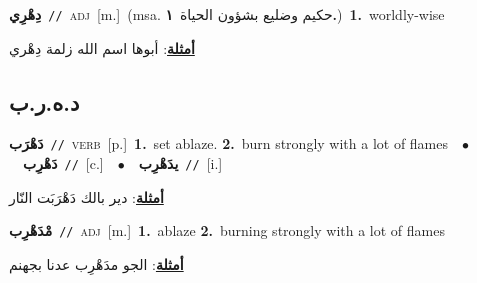 \documentclass[10pt,a4paper,twoside]{article} %
\begin{document}
\begin{multicols}{2}
{\setlength\topsep{0pt}\textbf{\foreignlanguage{arabic}{دِهْرِي}}\ {\color{gray}\texttt{//}\color{black}}\ \textsc{adj}\ [m.]\ \color{gray}(msa. \foreignlanguage{arabic}{حكيم وضليع بشؤون الحياة}~\foreignlanguage{arabic}{\textbf{١.}})\color{black}\ \textbf{1.}~worldly-wise\  \begin{flushright}\color{gray}\foreignlanguage{arabic}{\textbf{\underline{\foreignlanguage{arabic}{أمثلة}}}: أبوها اسم الله زلمة دِهْري}\end{flushright}\color{black}} \vspace{2mm}

\vspace{-3mm}
\subsection*{\color{blue}\foreignlanguage{arabic}{د.ه.ر.ب}\color{blue}{}} 

{\setlength\topsep{0pt}\textbf{\foreignlanguage{arabic}{دَهْرَب}}\ {\color{gray}\texttt{//}\color{black}}\ \textsc{verb}\ [p.]\ \textbf{1.}~set ablaze.  \textbf{2.}~burn strongly with a lot of flames\ \ $\bullet$\ \ \setlength\topsep{0pt}\textbf{\foreignlanguage{arabic}{دَهْرِب}}\ {\color{gray}\texttt{//}\color{black}}\ [c.]\ \ $\bullet$\ \ \setlength\topsep{0pt}\textbf{\foreignlanguage{arabic}{يدَهْرِب}}\ {\color{gray}\texttt{//}\color{black}}\ [i.]\  \begin{flushright}\color{gray}\foreignlanguage{arabic}{\textbf{\underline{\foreignlanguage{arabic}{أمثلة}}}: دير بالك دَهْرَبَت النّار}\end{flushright}\color{black}} \vspace{2mm}

{\setlength\topsep{0pt}\textbf{\foreignlanguage{arabic}{مْدَهْرِب}}\ {\color{gray}\texttt{//}\color{black}}\ \textsc{adj}\ [m.]\ \textbf{1.}~ablaze  \textbf{2.}~burning strongly with a lot of flames\  \begin{flushright}\color{gray}\foreignlanguage{arabic}{\textbf{\underline{\foreignlanguage{arabic}{أمثلة}}}: الجو مدَهْرِب عدنا بجهنم}\end{flushright}\color{black}} \vspace{2mm}


\end{multicols}
\end{document}
